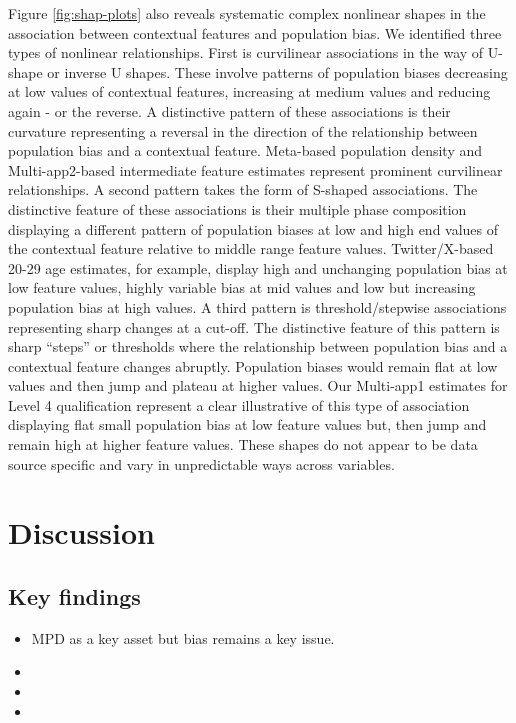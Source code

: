 \documentclass[]{rsos}%
\begin{document}
Figure \ref{fig:shap-plots} also reveals systematic complex nonlinear
shapes in the association between contextual features and population
bias. We identified three types of nonlinear relationships. First is
curvilinear associations in the way of U-shape or inverse U shapes.
These involve patterns of population biases decreasing at low values of
contextual features, increasing at medium values and reducing again - or
the reverse. A distinctive pattern of these associations is their
curvature representing a reversal in the direction of the relationship
between population bias and a contextual feature. Meta-based population
density and Multi-app2-based intermediate feature estimates represent
prominent curvilinear relationships. A second pattern takes the form of
S-shaped associations. The distinctive feature of these associations is
their multiple phase composition displaying a different pattern of
population biases at low and high end values of the contextual feature
relative to middle range feature values. Twitter/X-based 20-29 age
estimates, for example, display high and unchanging population bias at
low feature values, highly variable bias at mid values and low but
increasing population bias at high values. A third pattern is
threshold/stepwise associations representing sharp changes at a cut-off.
The distinctive feature of this pattern is sharp ``steps'' or thresholds
where the relationship between population bias and a contextual feature
changes abruptly. Population biases would remain flat at low values and
then jump and plateau at higher values. Our Multi-app1 estimates for
Level 4 qualification represent a clear illustrative of this type of
association displaying flat small population bias at low feature values
but, then jump and remain high at higher feature values. These shapes do
not appear to be data source specific and vary in unpredictable ways
across variables.

\section{Discussion}\label{discussion}

\subsection{Key findings}\label{key-findings}

\begin{itemize}
\item
  MPD as a key asset but bias remains a key issue.
\item
\item
\item
\end{itemize}
\end{document}
